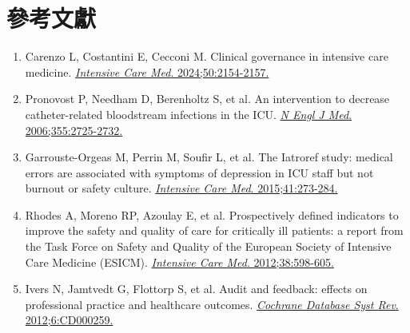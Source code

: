 \documentclass[12pt,a4paper]{article}
\begin{document}
\section{參考文獻}

\begin{enumerate}
    \item Carenzo L, Costantini E, Cecconi M. Clinical governance in intensive care medicine. \href{https://doi.org/10.1007/s00134-024-07653-8}{\textit{Intensive Care Med}. 2024;50:2154-2157.}

    \item Pronovost P, Needham D, Berenholtz S, et al. An intervention to decrease catheter-related bloodstream infections in the ICU. \href{https://doi.org/10.1056/NEJMoa061115}{\textit{N Engl J Med}. 2006;355:2725-2732.}

    \item Garrouste-Orgeas M, Perrin M, Soufir L, et al. The Iatroref study: medical errors are associated with symptoms of depression in ICU staff but not burnout or safety culture. \href{https://doi.org/10.1007/s00134-014-3601-4}{\textit{Intensive Care Med}. 2015;41:273-284.}

    \item Rhodes A, Moreno RP, Azoulay E, et al. Prospectively defined indicators to improve the safety and quality of care for critically ill patients: a report from the Task Force on Safety and Quality of the European Society of Intensive Care Medicine (ESICM). \href{https://doi.org/10.1007/s00134-011-2462-3}{\textit{Intensive Care Med}. 2012;38:598-605.}

    \item Ivers N, Jamtvedt G, Flottorp S, et al. Audit and feedback: effects on professional practice and healthcare outcomes. \href{https://doi.org/10.1002/14651858.CD000259.pub3}{\textit{Cochrane Database Syst Rev}. 2012;6:CD000259.}
\end{enumerate}
\end{document}
